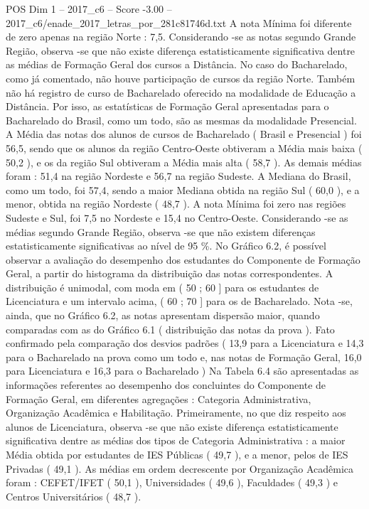 \begin{textsample}{POS Dim 1 – 2017\_c6 – Score -3.00 – 2017\_c6/enade\_2017\_letras\_por\_281c81746d.txt}
A nota Mínima foi diferente de zero apenas na região Norte : 7,5.
Considerando -se as notas segundo Grande Região, observa -se que não existe diferença estatisticamente significativa dentre as médias de Formação Geral dos cursos a Distância.
No caso do Bacharelado, como já comentado, não houve participação de cursos da região Norte.
Também não há registro de curso de Bacharelado oferecido na modalidade de Educação a Distância.
Por isso, as estatísticas de Formação Geral apresentadas para o Bacharelado do Brasil, como um todo, são as mesmas da modalidade Presencial.
A Média das notas dos alunos de cursos de Bacharelado ( Brasil e Presencial ) foi 56,5, sendo que os alunos da região Centro-Oeste obtiveram a Média mais baixa ( 50,2 ), e os da região Sul obtiveram a Média mais alta ( 58,7 ).
As demais médias foram : 51,4 na região Nordeste e 56,7 na região Sudeste.
A Mediana do Brasil, como um todo, foi 57,4, sendo a maior Mediana obtida na região Sul ( 60,0 ), e a menor, obtida na região Nordeste ( 48,7 ).
A nota Mínima foi zero nas regiões Sudeste e Sul, foi 7,5 no Nordeste e 15,4 no Centro-Oeste.
Considerando -se as médias segundo Grande Região, observa -se que não existem diferenças estatisticamente significativas ao nível de 95 \%.
No Gráfico 6.2, é possível observar a avaliação do desempenho dos estudantes do Componente de Formação Geral, a partir do histograma da distribuição das notas correspondentes.
A distribuição é unimodal, com moda em ( 50 ; 60 ] para os estudantes de Licenciatura e um intervalo acima, ( 60 ; 70 ] para os de Bacharelado.
Nota -se, ainda, que no Gráfico 6.2, as notas apresentam dispersão maior, quando comparadas com as do Gráfico 6.1 ( distribuição das notas da prova ).
Fato confirmado pela comparação dos desvios padrões ( 13,9 para a Licenciatura e 14,3 para o Bacharelado na prova como um todo e, nas notas de Formação Geral, 16,0 para Licenciatura e 16,3 para o Bacharelado ) Na Tabela 6.4 são apresentadas as informações referentes ao desempenho dos concluintes do Componente de Formação Geral, em diferentes agregações : Categoria Administrativa, Organização Acadêmica e Habilitação.
Primeiramente, no que diz respeito aos alunos de Licenciatura, observa -se que não existe diferença estatisticamente significativa dentre as médias dos tipos de Categoria Administrativa : a maior Média obtida por estudantes de IES Públicas ( 49,7 ), e a menor, pelos de IES Privadas ( 49,1 ).
As médias em ordem decrescente por Organização Acadêmica foram : CEFET/IFET ( 50,1 ), Universidades ( 49,6 ), Faculdades ( 49,3 ) e Centros Universitários ( 48,7 ).

\end{textsample}
